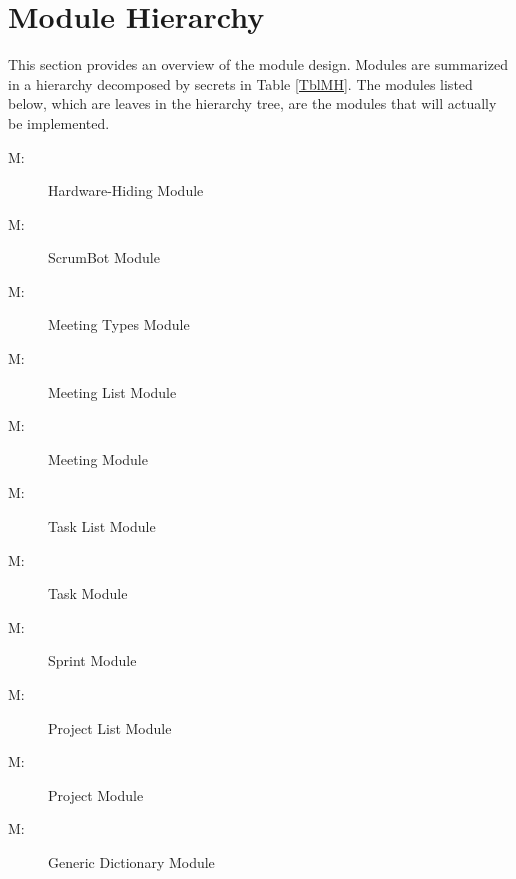 \documentclass[12pt, titlepage]{article}
\newcounter{mnum}
\newcommand{\mthemnum}{M\themnum}
\begin{document}
\section{Module Hierarchy} \label{SecMH}
This section provides an overview of the module design. Modules are summarized
in a hierarchy decomposed by secrets in Table \ref{TblMH}. The modules listed
below, which are leaves in the hierarchy tree, are the modules that will
actually be implemented.

\begin{description}
    \item [ \mthemnum \label{m1}:] Hardware-Hiding Module
    \item [ \mthemnum \label{m2}:] ScrumBot Module
    \item [ \mthemnum \label{m3}:] Meeting Types Module
    \item [ \mthemnum \label{m4}:] Meeting List Module
    \item [ \mthemnum \label{m5}:] Meeting Module
    \item [ \mthemnum \label{m6}:] Task List Module
    \item [ \mthemnum \label{m7}:] Task Module
    \item [ \mthemnum \label{m8}:] Sprint Module
    \item [ \mthemnum \label{m9}:] Project List Module
    \item [ \mthemnum \label{m10}:] Project Module
    \item [ \mthemnum \label{m11}:] Generic Dictionary Module
\end{description}
\end{document}
